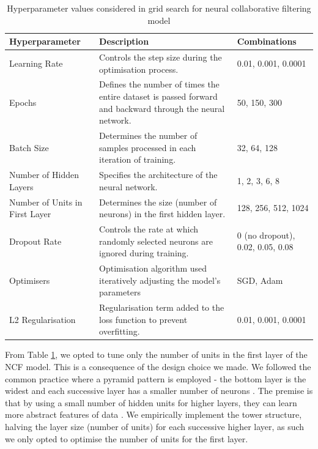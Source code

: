 \begin{table}[h]
    \centering
    \begin{tabular}{|p{6cm}|p{6cm}|p{3.5cm}|}
    \hline
    \textbf{Hyperparameter} & \textbf{Description}  & \textbf{Combinations} \\
    \hline
    Learning Rate & Controls the step size during the optimisation process. & 0.01, 0.001, 0.0001 \\
    Epochs & Defines the number of times the entire dataset is passed forward and backward through the neural network. & 50, 150, 300 \\
    Batch Size & Determines the number of samples processed in each iteration of training.  & 32, 64, 128 \\
    Number of Hidden Layers & Specifies the architecture of the neural network. & 1, 2, 3, 6, 8 \\
    Number of Units in First Layer & Determines the size (number of neurons) in the first hidden layer. & 128, 256, 512, 1024 \\
    Dropout Rate & Controls the rate at which randomly selected neurons are ignored during training. & 0 (no dropout), 0.02, 0.05, 0.08 \\
    Optimisers & Optimisation algorithm used iteratively adjusting the model's parameters & SGD, Adam \\
    L2 Regularisation & Regularisation term added to the loss function to prevent overfitting. & 0.01, 0.001, 0.0001 \\
    \hline
    \end{tabular}
    \caption{Hyperparameter values considered in grid search for neural collaborative filtering model}
    \label{tab:hyperparameters}
    \end{table}

From Table \ref{tab:hyperparameters}, we opted to tune only the number of units in the first layer of the NCF model. This is a consequence of the design choice we made. We followed the common practice where a pyramid pattern is employed - the bottom layer is the widest and each successive layer has a smaller number of neurons \cite{lecun2015deep}. The premise is that by using a small number of hidden units for higher layers, they can learn more abstract features of data \cite{lee2009convolutional}. We empirically implement the tower structure, halving the layer size (number of units) for each successive higher layer, as such we only opted to optimise the number of units for the first layer.

